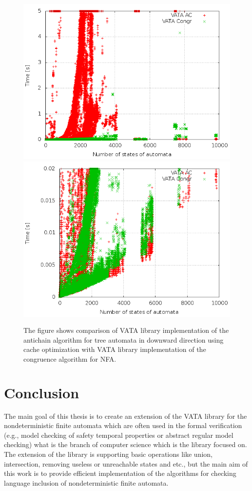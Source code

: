 \begin{figure}[t]
\begin{center}
\includegraphics[scale=0.3]{fig/plot_ca_zprava.png}
\includegraphics[scale=0.3]{fig/plot_ca_step_zprava.png}
\caption{The figure shows
 comparison of VATA library implementation of the antichain algorithm for tree automata in downward direction using cache optimization 
 with VATA library implementation of the congruence algorithm for NFA.}
\label{fig:figPlotCa}
\end{center}
\end{figure}

\chapter{Conclusion}
\label{concl}
The main goal of this thesis is to create an extension of the VATA library for the nondeterministic finite automata 
which are often used in the formal verification (e.g., model checking of safety temporal properties or 
abstract regular model checking) what is the branch of computer science which is the library focused on. The extension of the library is supporting
basic operations like union, intersection, removing useless or unreachable states and etc., but the main aim of this work is to provide
efficient implementation of the algorithms for checking language inclusion of nondeterministic finite automata.

